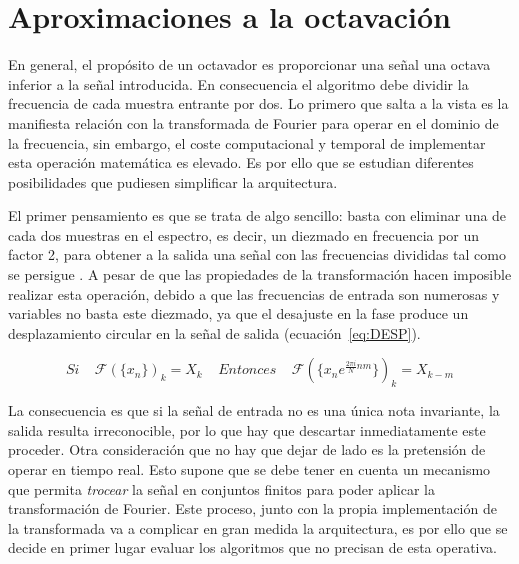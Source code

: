 \section{Aproximaciones a la octavación}
En general, el propósito de un octavador es proporcionar una señal una octava inferior a la señal introducida. En consecuencia el algoritmo debe dividir la frecuencia de cada muestra entrante por dos. Lo primero que salta a la vista es la manifiesta relación con la transformada de Fourier para operar en el dominio de la frecuencia, sin embargo, el coste computacional y temporal de implementar esta operación matemática es elevado. Es por ello que se estudian diferentes posibilidades que pudiesen simplificar la arquitectura.

El primer pensamiento es que se trata de algo sencillo: basta con eliminar una de cada dos muestras en el espectro, es decir, un diezmado en frecuencia por un factor 2, para obtener a la salida una señal con las frecuencias divididas tal como se persigue \cite{Oppenheim}. A pesar de que las propiedades de la transformación hacen imposible realizar esta operación, debido a que las frecuencias de entrada son numerosas y variables no basta este diezmado, ya que el desajuste en la fase produce un desplazamiento circular en la señal de salida (ecuación~\ref{eq:DESP}). 

\begin{equation}
\label{eq:DESP}
Si~~~~~\mathscr{F}(\{x_{n}\})_{k} = X_{k}~~~~~Entonces~~~~~\mathscr{F}(\{x_{n}e^{\frac{2\pi i}{N}nm}\})_{k}= X_{k-m} 
\end{equation}

La consecuencia es que si la señal de entrada no es una única nota invariante, la salida resulta irreconocible, por lo que hay que descartar inmediatamente este proceder. Otra consideración que no hay que dejar de lado es la pretensión de operar en tiempo real. Esto supone que se debe tener en cuenta un mecanismo que permita \emph{trocear} la señal en conjuntos finitos para poder aplicar la transformación de Fourier. Este proceso, junto con la propia implementación de la transformada va a complicar en gran medida la arquitectura, es por ello que se decide en primer lugar evaluar los algoritmos que no precisan de esta operativa.

